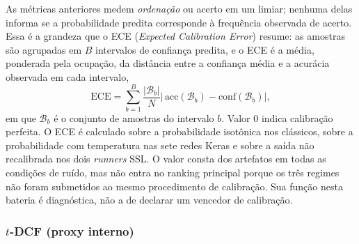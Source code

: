 \documentclass[12pt,a4paper]{article}
\begin{document}
As métricas anteriores medem \emph{ordenação} ou acerto em um limiar; nenhuma
delas informa se a probabilidade predita corresponde à frequência observada de
acerto. Essa é a grandeza que o ECE (\textit{Expected Calibration Error})
resume: as amostras são agrupadas em $B$ intervalos de confiança predita, e o
ECE é a média, ponderada pela ocupação, da distância entre a confiança média
e a acurácia observada em cada intervalo,
\begin{equation}
	\label{eq:ece}
	\mathrm{ECE} = \sum_{b=1}^{B}\frac{|\mathcal{B}_b|}{N}
	\left|\,\mathrm{acc}(\mathcal{B}_b) - \mathrm{conf}(\mathcal{B}_b)\right|,
\end{equation}
\noindent
em que $\mathcal{B}_b$ é o conjunto de amostras do intervalo $b$. Valor
\num{0} indica calibração perfeita. O ECE é calculado sobre a probabilidade
isotônica nos clássicos, sobre a probabilidade com temperatura nas sete redes
Keras e sobre a saída não recalibrada nos dois \textit{runners} SSL. O valor
consta dos artefatos em todas as condições de ruído, mas não entra no ranking
principal porque os três regimes não foram submetidos ao mesmo procedimento de
calibração. Sua função nesta bateria é diagnóstica, não a de declarar um
vencedor de calibração.

\subsubsection*{$t$-DCF (proxy interno)}
\label{sec:tdcf_def}
\end{document}
